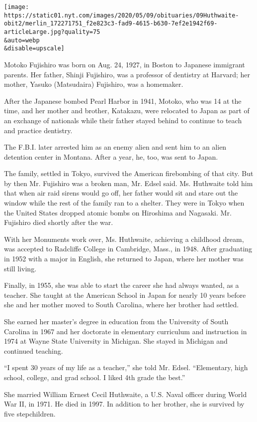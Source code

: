 \texttt{[image: https://static01.nyt.com/images/2020/05/09/obituaries/09Huthwaite-obit2/merlin\_172271751\_f2e823c3-fad9-4615-b630-7ef2e1942f69-articleLarge.jpg?quality=75\\\&auto=webp\\\&disable=upscale]}

Motoko Fujishiro was born on Aug. 24, 1927, in Boston to Japanese
immigrant parents. Her father, Shinji Fujishiro, was a professor of
dentistry at Harvard; her mother, Yasuko (Matsudaira) Fujishiro, was a
homemaker.

After the Japanese bombed Pearl Harbor in 1941, Motoko, who was 14 at
the time, and her mother and brother, Katakazu, were relocated to Japan
as part of an exchange of nationals while their father stayed behind to
continue to teach and practice dentistry.

The F.B.I. later arrested him as an enemy alien and sent him to an alien
detention center in Montana. After a year, he, too, was sent to Japan.

The family, settled in Tokyo, survived the American firebombing of that
city. But by then Mr. Fujishiro was a broken man, Mr. Edsel said. Ms.
Huthwaite told him that when air raid sirens would go off, her father
would sit and stare out the window while the rest of the family ran to a
shelter. They were in Tokyo when the United States dropped atomic bombs
on Hiroshima and Nagasaki. Mr. Fujishiro died shortly after the war.

With her Monuments work over, Ms. Huthwaite, achieving a childhood
dream, was accepted to Radcliffe College in Cambridge, Mass., in 1948.
After graduating in 1952 with a major in English, she returned to Japan,
where her mother was still living.

Finally, in 1955, she was able to start the career she had always
wanted, as a teacher. She taught at the American School in Japan for
nearly 10 years before she and her mother moved to South Carolina, where
her brother had settled.

She earned her master's degree in education from the University of South
Carolina in 1967 and her doctorate in elementary curriculum and
instruction in 1974 at Wayne State University in Michigan. She stayed in
Michigan and continued teaching.

``I spent 30 years of my life as a teacher,'' she told Mr. Edsel.
``Elementary, high school, college, and grad school. I liked 4th grade
the best.''

She married William Ernest Cecil Huthwaite, a U.S. Naval officer during
World War II, in 1971. He died in 1997. In addition to her brother, she
is survived by five stepchildren.

